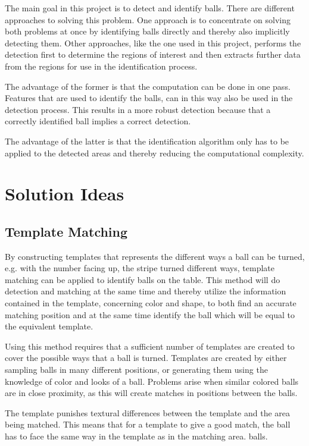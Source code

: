 The main goal in this project is to detect and identify balls. There are different approaches to solving this problem. One approach is to concentrate on solving both problems at once by identifying balls directly and thereby also implicitly detecting them. Other approaches, like the one used in this project, performs the detection first to determine the regions of interest and then extracts further data from the regions for use in the identification process.

The advantage of the former is that the computation can be done in one pass. Features that are used to identify the balls, can in this way also be used in the detection process. This results in a more robust detection because that a correctly identified ball implies a correct detection.

The advantage of the latter is that the identification algorithm only has to be applied to the detected areas and thereby reducing the computational complexity.

\section{Solution Ideas}

\subsection{Template Matching}
By constructing templates that represents the different ways a ball can be turned, e.g. with the number facing up, the stripe turned different ways, template matching can be applied to identify balls on the table. This method will do detection and matching at the same time and thereby utilize the information contained in the template, concerning color and shape, to both find an accurate matching position and at the same time identify the ball which will be equal to the equivalent template.

Using this method requires that a sufficient number of templates are created to cover the possible ways that a ball is turned. Templates are created by either sampling balls in many different positions, or generating them using the knowledge of color and looks of a ball. Problems arise when similar colored balls are in close proximity, as this will create matches in positions between the balls.

The template punishes textural differences between the template and the area being matched. This means that for a template to give a good match, the ball has to face the same way in the template as in the matching area.
balls. 


